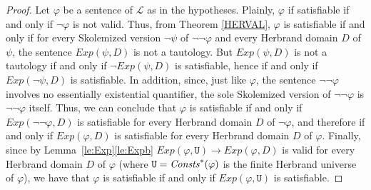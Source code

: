 \documentclass[a4paper]{llncs}
\newcommand{\Lang}{\ensuremath{\mathcal{L}\xspace}} %
\newcommand{\Univ}{\mathtt{U}}
\newcommand{\HExp}{Exp}
\begin{document}
\begin{proof}
Let $\varphi$ be a sentence of $\Lang$ as in the hypotheses. Plainly, 
$\varphi$ if satisfiable if and only if $\neg \varphi$ is not valid. 
Thus, from Theorem \ref{HERVAL}, $\varphi$ is satisfiable if and only 
if for every Skolemized version $\neg \psi$ of $\neg \neg \varphi$ 
and every Herbrand domain $D$ of $\psi$, the sentence $\HExp(\psi, 
D)$ is not a tautology. But $\HExp(\psi, D)$ is not a tautology if 
and only if $\neg \HExp(\psi, D)$ is satisfiable, hence if and only 
if $\HExp(\neg \psi, D)$ is satisfiable. In addition, since, just 
like $\varphi$, the sentence $\neg \neg \varphi$ involves no 
essentially existential quantifier, the sole Skolemized version of 
$\neg \neg \varphi$ is $\neg \neg \varphi$ itself. Thus, we can 
conclude that $\varphi$ is satisfiable if and only if $\HExp(\neg 
\neg \varphi, D)$ is satisfiable for every Herbrand domain $D$ of 
$\neg \varphi$, and therefore if and only if $\HExp(\varphi, D)$ is 
satisfiable for every Herbrand domain $D$ of $\varphi$. Finally, 
since by Lemma~\ref{le:Exp}\ref{le:Expb} $\HExp(\varphi, \Univ) 
\rightarrow \HExp(\varphi, D)$ is valid for every Herbrand domain $D$ 
of $\varphi$ (where $\Univ = \Consts^*(\varphi)$ is the finite 
Herbrand universe of $\varphi$), we have that $\varphi$ is 
satisfiable if and only if $\HExp(\varphi, \Univ)$ is satisfiable.


\end{proof}
\end{document}
